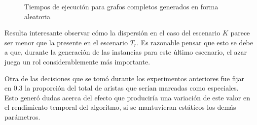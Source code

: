     \begin{figure}[H]
        \centering
        \caption{Tiempos de ejecución para grafos completos generados en forma
        aleatoria}
        \label{fig:exp1:aleatorios-comp}
    \end{figure}

    Resulta interesante observar cómo la dispersión en el caso del escenario
    $K$ parece ser menor que la presente en el escenario $T_r$. Es razonable
    pensar que esto se debe a que, durante la generación de las instancias
    para este último escenario, el azar juega un rol considerablemente más
    importante.

    Otra de las decisiones que se tomó durante los experimentos anteriores fue
    fijar en $0.3$ la proporción del total de aristas que serían marcadas como
    especiales. Esto generó dudas acerca del efecto que produciría una
    variación de este valor en el rendimiento temporal del algoritmo,
    si se mantuvieran estáticos los demás parámetros.


